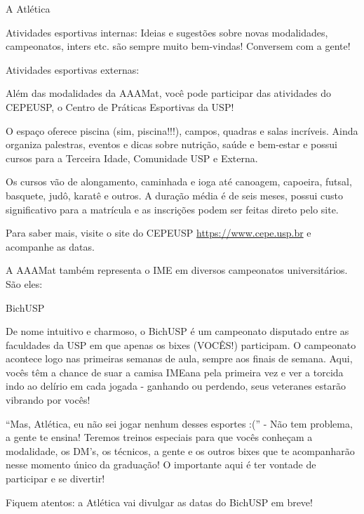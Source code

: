 \begin{secao}{A Atlética}
\begin{subsecao}{Atividades esportivas internas:}
Ideias e sugestões sobre novas modalidades, campeonatos, inters etc. são
sempre muito bem-vindas! Conversem com a gente!

\end{subsecao}

\begin{subsecao}{Atividades esportivas externas:}

Além das modalidades da AAAMat, você pode participar das atividades do CEPEUSP, o 
Centro de Práticas Esportivas da USP! 

O espaço oferece piscina (sim, piscina!!!), campos, quadras e salas incríveis.
Ainda organiza palestras, eventos e dicas sobre nutrição, saúde e bem-estar e possui 
cursos para a Terceira Idade, Comunidade USP e Externa. 

Os cursos vão de alongamento, caminhada e ioga até canoagem, capoeira, futsal, 
basquete, judô, karatê e outros. A duração média é de seis meses, possui custo 
significativo para a matrícula e as inscrições podem ser feitas direto pelo site. 

Para saber mais, visite o site do CEPEUSP \url{https://www.cepe.usp.br} e acompanhe as
datas. 

\end{subsecao}

A AAAMat também representa o IME em diversos campeonatos universitários. São
eles:

\begin{subsecao}{BichUSP}

De nome intuitivo e charmoso, o BichUSP é um campeonato disputado entre as
faculdades da USP em que apenas os bixes (VOCÊS!) participam. O campeonato
acontece logo nas primeiras semanas de aula, sempre aos finais de semana. Aqui,
vocês têm a chance de suar a camisa IMEana pela primeira vez e ver a torcida
indo ao delírio em cada jogada - ganhando ou perdendo, seus veteranes estarão
vibrando por vocês!

``Mas, Atlética, eu não sei jogar nenhum desses esportes :('' - Não tem
problema, a gente te ensina! Teremos treinos especiais para que vocês conheçam
a modalidade, os DM’s, os técnicos, a gente e os outros bixes que te
acompanharão nesse momento único da graduação! O importante aqui é ter vontade
de participar e se divertir!

Fiquem atentos: a Atlética vai divulgar as datas do BichUSP em breve!


\end{subsecao}
\end{secao}
